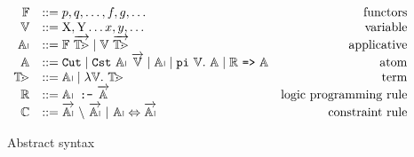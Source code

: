 \documentclass[a4paper, 11pt]{book}
\begin{document}
\begin{figure}
  $$
  \begin{array}{rlr}
    \PRED & ::= p, q, \ldots, f, g, \ldots & \mathrm{functors}\\
    \VAR & ::= \mathrm{X}, \mathrm{Y} \ldots x, y, \ldots & \mathrm{variable}\\
    \APP & ::= \PRED\ \vecL{\TERM} \mid  \VAR\ \vecL{\TERM} & \mathrm{applicative}\\
    \ATOM& ::= \cut \mid \cst\ \APP\ \vecL{\VAR} \mid \APP \mid \piCmd{\VAR}{\ATOM} \mid \implCmd{{\CLAUSE}}{\ATOM} & \mathrm{atom} \\
    \TERM & ::= \APP \mid \lambda \VAR \bs\ \TERM & \mathrm{term}\\
    \CLAUSE & ::= \clauseCmd{\APP}{\!}{\vecL{\ATOM}} & \mathrm{logic\ programming\ rule}\\
    \CHR & ::= \vecL{\APP}\ \backslash\ \vecL{\APP}\ 
               \mathrm{|}\ \APP \Leftrightarrow  \vecL{\APP} & \mathrm{constraint\ rule}
  \end{array}
  $$
  \caption{Abstract syntax}
  \label{fig:syntax}
\end{figure}

\newenvironment{myRule}[1]{%
  \begin{minipage}{.9\textwidth}
    \centering
    \begin{prooftree}%
      } %
      {
    \end{prooftree}
    \vspace{2pt}
  \end{minipage}
}
\newcommand{\arr}{\ensuremath{\rightsquigarrow}}
\newcommand{\atsign}{\ensuremath{\mbox{\footnotesize\raisebox{-1pt}{\ensuremath{@}}}}}
\makeatletter
\newcommand{\customlabel}[2]{%
  \protected@write \@auxout {}{\string \newlabel {#1}{{\ensuremath{#2}}{\thepage}{#2}{#1}{}} }%
  \hypertarget{#1}{\ensuremath{#2}}
}
\makeatother
\newcommand{\Keyword}[1]{\texttt{{\fontfamily{qcr}\selectfont #1}}}

\newcommand{\kIF}{\Keyword{if}}
\newcommand{\kTHEN}{\Keyword{then}}
\newcommand{\kELSE}{\Keyword{else}}
\newcommand{\kAS}{\Keyword{as}}
\newcommand{\runCmdR}[3]{\ensuremath{\run\ (k,\ #3,\ #1)\ #2 \arr r}}
\newcommand{\runCmdRK}[4]{\ensuremath{\run\ (#4,\ #3,\ #1)\ #2 \arr r}}
\newcommand{\runCmd}[7]{\ensuremath{\run\ (#4,\ #3,\ #1)\ #2 \arr (#7,\ #6,\ #5)}}
\newcommand{\runCmdQR}[2]{\ensuremath{\run\ #1\ #2 \arr r}}
\newcommand{\runQuery}[2]{\ensuremath{\run\ (\EmptySubst,\ \EmptySubst,\ #1)\ #2 \arr \_}}
\newcommand{\runCmdF}[3]{\ensuremath{\run\ (k,\ #3,\ #1)\ #2 \arr \bot}}
\newcommand{\callCmd}[2]{\ensuremath{(#1\ #2)}\xspace}
\newcommand{\goalCmd}[3]{\ensuremath{(#1,\ #2,\ #3)}\xspace}
\newcommand{\ruleName}[2]{\customlabel{#1}{\ensuremath{\mathrm{run}_{#2}}}}
\newcommand{\RightLabelM}[1]{\RightLabel{\scriptsize #1}}
\end{document}
